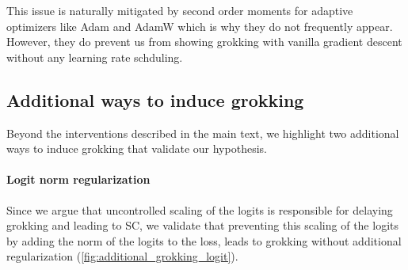 This issue is naturally mitigated by second order moments for adaptive optimizers like Adam and AdamW which is why they do not frequently appear. However, they do prevent us from showing grokking with vanilla gradient descent without any learning rate schduling. 


\subsection{Additional ways to induce grokking}
Beyond the interventions described in the main text, we highlight two additional ways to induce grokking that validate our hypothesis. 

\paragraph{Logit norm regularization}
Since we argue that uncontrolled scaling of the logits is responsible for delaying grokking and leading to SC, we validate that preventing this scaling of the logits by adding the norm of the logits to the loss, leads to grokking without additional regularization (\cref{fig:additional_grokking_logit}).



